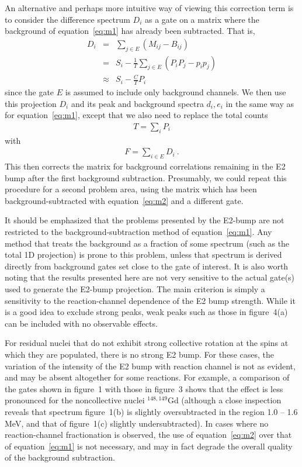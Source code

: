 An alternative and perhaps more intuitive way of viewing this correction term
is to consider the difference spectrum $D_i$ as a gate on a matrix where the
background of equation~\ref{eq:m1} has already been subtracted. That is,
\begin{eqnarray}
D_i & = & \sum_{j \in E} ( M_{ij} - B_{ij} )                     \nonumber \\
    & = & S_i - \frac {1}{T} \sum_{j \in E} (P_i P_j - p_i p_j)  \nonumber \\
    & \approx & S_i - \frac {C}{T} P_i
\end{eqnarray}
since the gate $E$ is assumed to include only background channels. We then use
this projection $D_i$ and its peak and background spectra $d_i, e_i$ in the
same way as for equation~\ref{eq:m1}, except that we also need to replace the
total counts
\begin{eqnarray*}
T = \sum_i P_i
\end{eqnarray*}
with 
\begin{eqnarray*}
F = \sum_{i \in E} D_i \ .
\end{eqnarray*}
This then corrects the matrix for background correlations remaining in the E2
bump after the first background subtraction. Presumably, we could repeat this
procedure for a second problem area, using the matrix which has been
background-subtracted with equation~\ref{eq:m2} and a different gate.

It should be emphasized that the problems presented by the E2-bump are not
restricted to the background-subtraction method of equation~\ref{eq:m1}. Any
method that treats the background as a fraction of some spectrum (such as the
total 1D projection) is prone to this problem, unless that spectrum is derived
directly from background gates set close to the gate of interest. It is also
worth noting that the results presented here are not very sensitive to the
actual gate(s) used to generate the E2-bump projection. The main criterion is
simply a sensitivity to the reaction-channel dependence of the E2 bump
strength. While it is a good idea to exclude strong peaks, weak peaks such as
those in figure~4(a) can be included with no observable effects.

For residual nuclei that do not exhibit strong collective rotation at the spins
at which they are populated, there is no strong E2 bump. For these cases, the
variation of the intensity of the E2 bump with reaction channel is not as
evident, and may be absent altogether for some reactions. For example, a
comparison of the gates shown in figure~1 with those in figure~3 shows that the
effect is less pronounced for the noncollective nuclei $^{148,149}$Gd (although
a close inspection reveals that spectrum figure~1(b) is slightly oversubtracted
in the region 1.0 -- 1.6 MeV, and that of figure~1(c) slightly
undersubtracted). In cases where no reaction-channel fractionation is observed,
the use of equation~\ref{eq:m2} over that of equation~\ref{eq:m1} is not
necessary, and may in fact degrade the overall quality of the background
subtraction.


